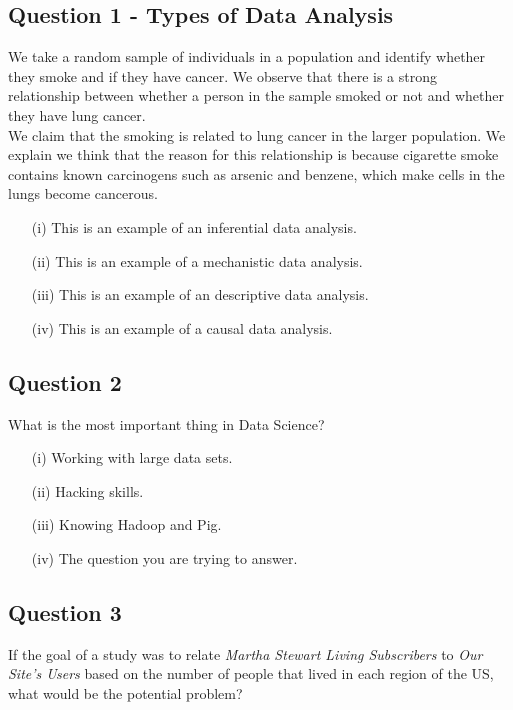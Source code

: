 \documentclass[12pt]{article}
\begin{document}
\newpage
	\subsection*{Question 1 - Types of Data Analysis}
We take a random sample of individuals in a population and identify whether they smoke and if they have cancer. We observe that there is a strong relationship between whether a person in the sample smoked or not and whether they have lung cancer. \\

\bigskip
\noindent We claim that the smoking is related to lung cancer in the larger population. We explain we think that the reason for this relationship is because cigarette smoke contains known carcinogens such as arsenic and benzene, which make cells in the lungs become cancerous.
\begin{itemize}
\item[(i)] This is an example of an inferential data analysis.
\item[(ii)] This is an example of a mechanistic data analysis.
\item[(iii)] This is an example of an descriptive data analysis.
\item[(iv)] This is an example of a causal data analysis.
\end{itemize}
\newpage
\subsection*{Question 2}
What is the most important thing in Data Science?
\begin{itemize}
\item[(i)] Working with large data sets.
\item[(ii)] Hacking skills.
\item[(iii)] Knowing Hadoop and Pig.
\item[(iv)] The question you are trying to answer.
\end{itemize}
\newpage
\subsection*{Question 3}
If the goal of a study was to relate \textit{Martha Stewart Living Subscribers} to \textit{Our Site's Users} based on the number of people that lived in each region of the US, what would be the potential problem? 
\end{document}

